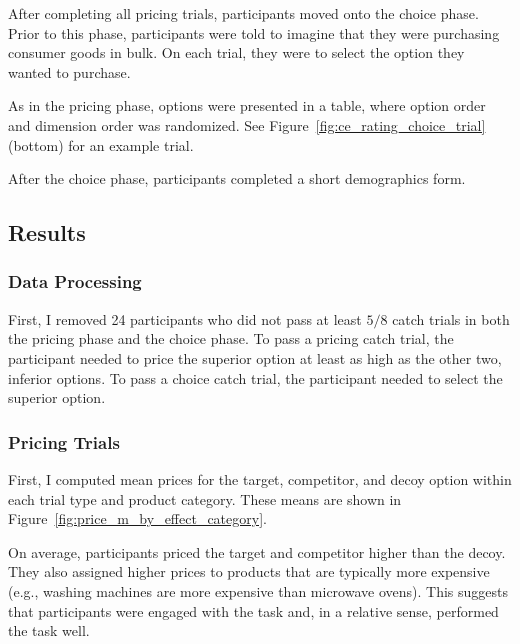 After completing all pricing trials, participants moved onto the choice phase. Prior to this phase, participants were told to imagine that they were purchasing consumer goods in bulk. On each trial, they were to select the option they wanted to purchase. 

As in the pricing phase, options were presented in a table, where option order and dimension order was randomized. See Figure~\ref{fig:ce_rating_choice_trial} (bottom) for an example trial.

After the choice phase, participants completed a short demographics form.

\subsection{Results}

\subsubsection{Data Processing}

First, I removed 24 participants who did not pass at least $5/8$ catch trials in both the pricing phase and the choice phase. To pass a pricing catch trial, the participant needed to price the superior option at least as high as the other two, inferior options. To pass a choice catch trial, the participant needed to select the superior option. 

\subsubsection{Pricing Trials}

First, I computed mean prices for the target, competitor, and decoy option within each trial type and product category. These means are shown in Figure~\ref{fig:price_m_by_effect_category}.

On average, participants priced the target and competitor higher than the decoy. They also assigned higher prices to products that are typically more expensive (e.g., washing machines are more expensive than microwave ovens). This suggests that participants were engaged with the task and, in a relative sense, performed the task well.

